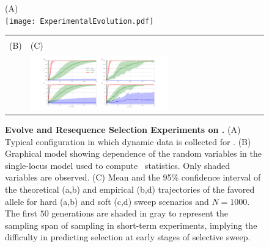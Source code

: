\begin{figure}[H]
		\centering
(A)\\
	\texttt{[image: ExperimentalEvolution.pdf]}\\

\begin{tabular}{l|l}
		\hline\\
		(B) &(C)\\
		\raisebox{0.5in}{
\texttt{[image: HMMGM.pdf]}}
& 	\includegraphics[trim=0in 0.in 0in 
0.0in,clip,width=0.6\textwidth]{AF.pdf}	

\end{tabular}
\hspace{-1in}
\caption{{\bf Evolve and Resequence Selection Experiments on \dmel.} (A) 
Typical 
configuration in which dynamic data is collected for \dmel.
(B) Graphical model showing dependence of the random variables in the 
single-locus model used to compute \comale\ statistics. Only shaded 
variables are observed.
(C) 			Mean and the 95\% confidence interval of the theoretical (a,b) and 
empirical (b,d)			trajectories of the favored allele for hard (a,b) and soft 
(c,d) 
sweep scenarios and $N=1000$.
			The first $50$
		generations are shaded in gray to represent the
		sampling span of sampling in short-term experiments, implying the 
		difficulty in predicting selection
		at early stages of selective sweep.  }
\label{fig:1}
\end{figure}






